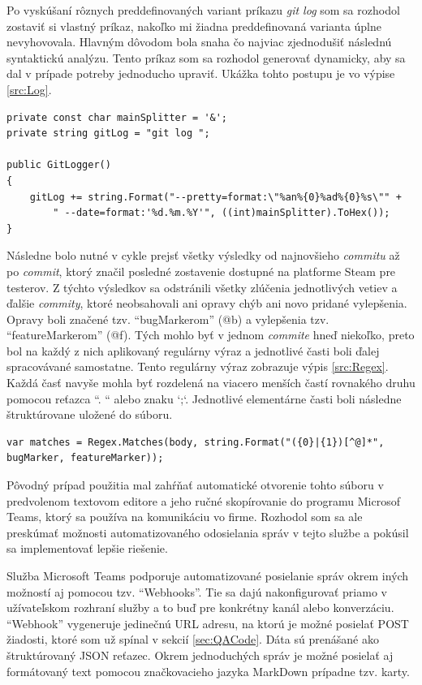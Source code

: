 \documentclass[slovak,bachelorpractice,dept460,male,csharp,cpdeclaration]{diploma}
\begin{document}
Po vyskúšaní rôznych preddefinovaných variant príkazu \textit{git log} som sa rozhodol zostaviť si vlastný príkaz, nakoľko mi žiadna preddefinovaná varianta úplne nevyhovovala. Hlavným dôvodom bola snaha čo najviac zjednodušiť následnú syntaktickú analýzu. Tento príkaz som sa rozhodol generovať dynamicky, aby sa dal v prípade potreby jednoducho upraviť. Ukážka tohto postupu je vo výpise \ref{src:Log}.
\vspace{10pt}
\begin{lstlisting}[label=src:Log,caption={Generovanie vlastného príkazu git log}]
private const char mainSplitter = '&';
private string gitLog = "git log ";

public GitLogger()
{
    gitLog += string.Format("--pretty=format:\"%an%{0}%ad%{0}%s\"" +
        " --date=format:'%d.%m.%Y'", ((int)mainSplitter).ToHex());
}
\end{lstlisting}

Následne bolo nutné v cykle prejsť všetky výsledky od najnovšieho \textit{commitu} až po \textit{commit}, ktorý značil posledné zostavenie dostupné na platforme Steam pre testerov. Z týchto výsledkov sa odstránili všetky zlúčenia jednotlivých vetiev a ďalšie  \textit{commity}, ktoré neobsahovali ani opravy chýb ani novo pridané vylepšenia. Opravy boli značené tzv. \enquote{bugMarkerom} (@b) a vylepšenia tzv. \enquote{featureMarkerom} (@f). Tých mohlo byť v jednom \textit{commite} hneď niekoľko, preto bol na každý z nich aplikovaný regulárny výraz a jednotlivé časti boli ďalej spracovávané samostatne. Tento regulárny výraz zobrazuje výpis \ref{src:Regex}. Každá časť navyše mohla byť rozdelená na viacero menších častí rovnakého druhu pomocou reťazca ``. `` alebo znaku `;`. Jednotlivé elementárne časti boli následne štruktúrovane uložené do súboru.
\vspace{10pt}
\begin{lstlisting}[label=src:Regex,caption={Regulárny výraz na rozdelenie tela \textit{commitu}}]
var matches = Regex.Matches(body, string.Format("({0}|{1})[^@]*", bugMarker, featureMarker));
\end{lstlisting}

Pôvodný prípad použitia mal zahŕňať automatické otvorenie tohto súboru v predvolenom textovom editore a jeho ručné skopírovanie do programu Microsof Teams, ktorý sa používa na komunikáciu vo firme. Rozhodol som sa ale preskúmať možnosti automatizovaného odosielania správ v tejto službe a pokúsil sa implementovať lepšie riešenie.

Služba Microsoft Teams podporuje automatizované posielanie správ okrem iných možností aj pomocou tzv. \enquote{Webhooks}. Tie sa dajú nakonfigurovať priamo v užívateľskom rozhraní služby a to buď pre konkrétny kanál alebo konverzáciu. \enquote{Webhook} vygeneruje jedinečnú URL adresu, na ktorú je možné posielať POST žiadosti, ktoré som už spínal v sekcií \ref{sec:QACode}. Dáta sú prenášané ako štruktúrovaný JSON reťazec. Okrem jednoduchých správ je možné posielať aj formátovaný text pomocou značkovacieho jazyka MarkDown prípadne tzv. karty. 
\end{document}
